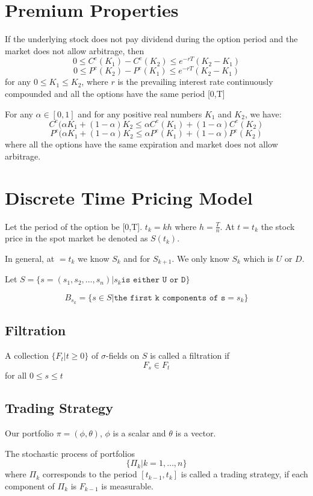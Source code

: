 \documentclass{report}
\begin{document}
\section{Premium Properties}
If the underlying stock does not pay dividend during the option period and the market does not allow arbitrage, then
\[0 \leq C^e(K_1) - C^e(K_2) \leq e^{-rT}(K_2-K_1)\]
\[0 \leq P^e(K_2) - P^e(K_1) \leq e^{-rT}(K_2-K_1)\]
for any $0 \leq K_1 \leq K_2$, where $r$ is the prevailing interest rate continuously compounded and all the options have the same period [0,T]


For any $\alpha \in [0,1]$ and for any positive real numbers $K_1$ and $K_2$, we have:
\[C^e(\alpha K_1 + (1-\alpha)K_2 \leq \alpha C^e(K_1) + (1-\alpha)C^e(K_2) \]
\[P^e(\alpha K_1 + (1-\alpha)K_2 \leq \alpha P^e(K_1) + (1-\alpha)P^e(K_2) \]
where all the options have the same expiration and market does not allow arbitrage.


\section{Discrete Time Pricing Model}
Let the period of the option be [0,T]. $t_k = kh$ where $h = \frac{T}{n}$. At $t = t_k$ the stock price in the spot market be denoted as $S(t_k)$.


In general, at $=t_k$ we know $S_k$ and for $S_{k+1}$. We only know $S_k$ which is $U$ or $D$.

Let $S = \{s = (s_1, s_2, \dots, s_n) | s_k \texttt{is either U or D}\}$


\[B_{s_k} = \{s \in S | \texttt{the first k components of s} = s_k \}\]



\subsection{Filtration}
A collection $\{F_t | t \geq 0\}$ of $\sigma$-fields on $S$ is called a filtration if 
\[F_s \in F_t\]
for all $0 \leq s \leq t$


\subsection{Trading Strategy}
Our portfolio $\pi = (\phi, \theta)$, $\phi$ is a scalar and $\theta$ is a vector.


The stochastic process of portfolios
\[\{\Pi_k | k = 1, \dots, n\}\]
where $\Pi_k$ corresponds to the period $[t_{k-1}, t_k]$ is called a trading strategy, if each component of $\Pi_k$ is $F_{k-1}$ is measurable.
\end{document}
